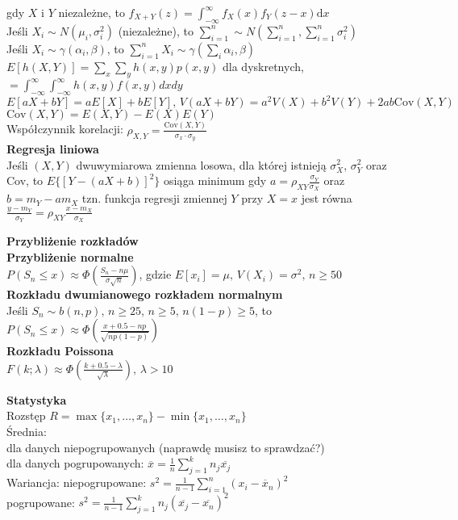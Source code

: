 \documentclass[10pt,landscape,a4paper,notitlepage]{article}
\begin{document}
\begin{multicols*}{4}
        gdy $X$ i $Y$ niezależne, to $f_{X+Y}(z)=\int_{-\infty}^{\infty}f_X(x)f_Y(z-x)\mathrm{d}x$\\
        Jeśli $X_i\sim N(\mu_i,\sigma_i^2)$ (niezależne), to $\sum_{i=1}^n\sim N(\sum_{i=1}^n,\sum_{i=1}^n\sigma_i^2)$\\
        Jeśli $X_i\sim \gamma(\alpha_i,\beta)$, to $\sum_{i=1}^nX_i\sim \gamma(\sum_i\alpha_i,\beta)$\\
        $E[h(X,Y)]=\sum_x\sum_yh(x,y)p(x,y)$ dla dyskretnych, $=\int_{-\infty}^{\infty}\int_{-\infty}^{\infty}h(x,y)f(x,y)dxdy$\\
        $E[aX+bY]=aE[X]+bE[Y],\,V(aX+bY)=a^2V(X)+b^2V(Y)+2ab\mathrm{Cov}(X,Y)$\\
        $\mathrm{Cov}(X,Y)=E(X,Y)-E(X)E(Y)$\\
        Współczynnik korelacji: $\rho_{X,Y}=\frac{\mathrm{Cov}(X,Y)}{\sigma_x\cdot\sigma_y}$\\
        \textbf{Regresja liniowa}\\
        Jeśli $(X,Y)$ dwuwymiarowa zmienna losowa, dla której istnieją $\sigma_X^2,\,\sigma_Y^2$ oraz Cov, to $E\{[Y-(aX+b)]^2\}$ osiąga minimum gdy $a=\rho_{XY}\frac{\sigma_Y}{\sigma_X}$ oraz $b=m_Y-am_X$
        tzn. funkcja regresji zmiennej $Y$ przy $X=x$ jest równa $\frac{y-m_Y}{\sigma_Y}=\rho_{XY}\frac{x-m_X}{\sigma_X}$

        \noindent\textbf{\large Przybliżenie rozkładów}\\
        \textbf{Przybliżenie normalne}\\
        $P(S_n\leq x)\approx \Phi(\frac{S_n-n\mu}{\sigma\sqrt{n}})$, gdzie $E[x_i]=\mu,\,V(X_i)=\sigma^2,\,n\geq 50$\\
        \textbf{Rozkładu dwumianowego rozkładem normalnym}\\
        Jeśli $S_n\sim b(n,p),\,n\geq 25,\, n\geq 5,\, n(1-p)\geq 5$, to $P(S_n\leq x)\approx\Phi\left(\frac{x+0.5-np}{\sqrt{np(1-p)}}\right)$\\
        \textbf{Rozkładu Poissona}\\
        $F(k;\lambda)\approx \Phi\left(\frac{k+0.5-\lambda}{\sqrt{\lambda}}\right),\,\lambda>10$

        \noindent\textbf{\large Statystyka}\\
        Rozstęp $R=\max\{x_1,\ldots,x_n\}-\min\{x_1,\ldots,x_n\}$\\
        Średnia:\\
        dla danych niepogrupowanych (naprawdę musisz to sprawdzać?)\\
        dla danych pogrupowanych: $\overline{x}=\frac{1}{n}\sum_{j=1}^kn_j\overline{x_j}$\\
        Wariancja: niepogrupowane: $s^2=\frac{1}{n-1}\sum_{i=1}^n(x_i-\overline{x}_n)^2$\\
        pogrupowane: $s^2=\frac{1}{n-1}\sum_{j=1}^kn_j(\overline{x_j}-\overline{x_n})^2$
    \end{multicols*}
\end{document}
